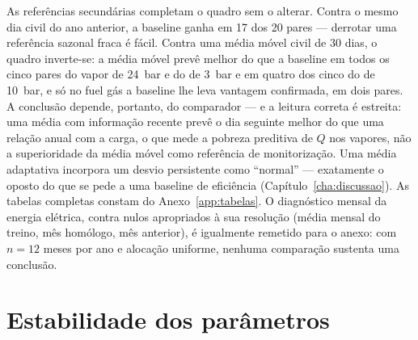 As referências secundárias completam o quadro sem o alterar. Contra o mesmo
dia civil do ano anterior, a baseline ganha em 17 dos 20 pares --- derrotar
uma referência sazonal fraca é fácil. Contra uma média móvel civil de 30
dias, o quadro inverte-se: a média móvel prevê melhor do que a baseline em
todos os cinco pares do vapor de 24~bar e do de 3~bar e em quatro dos cinco
do de 10~bar, e só no fuel gás a baseline lhe leva vantagem confirmada, em
dois pares. A conclusão depende, portanto, do comparador --- e a leitura
correta é estreita: uma média com informação recente prevê o dia seguinte
melhor do que uma relação anual com a carga, o que mede a pobreza preditiva
de $Q$ nos vapores, não a superioridade da média móvel como referência de
monitorização. Uma média adaptativa incorpora um desvio persistente como
``normal'' --- exatamente o oposto do que se pede a uma baseline de eficiência
(Capítulo~\ref{cha:discussao}). As tabelas completas constam do
Anexo~\ref{app:tabelas}. O diagnóstico mensal da energia elétrica, contra
nulos apropriados à sua resolução (média mensal do treino, mês homólogo, mês
anterior), é igualmente remetido para o anexo: com $n{=}12$ meses por ano e
alocação uniforme, nenhuma comparação sustenta uma conclusão.

\section{Estabilidade dos parâmetros}
\label{sec:estabilidade}


